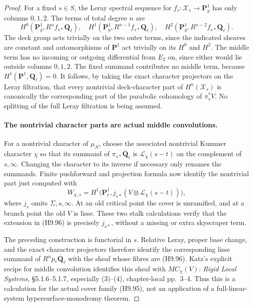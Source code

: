 \begin{proof}
For a fixed $s\in S$, the Leray spectral sequence for
$f_s:\mathcal X_s\to\mathbf P^1_y$ has only columns $0,1,2$.
The terms of total degree $n$ are
\[
 H^0(\mathbf P^1_y,R^n f_{s*}\mathbf Q_\ell),\quad
 H^1(\mathbf P^1_y,R^{n-1}f_{s*}\mathbf Q_\ell),\quad
 H^2(\mathbf P^1_y,R^{n-2}f_{s*}\mathbf Q_\ell).
\]
The deck group acts trivially on the two outer terms, since
the indicated sheaves are constant and automorphisms of
$\mathbf P^1$ act trivially on its $H^0$ and $H^2$.
The middle term has no incoming or outgoing differential from
$E_2$ on, since either would lie outside columns $0,1,2$.
The fixed summand contributes no middle term, because
$H^1(\mathbf P^1,\mathbf Q_\ell)=0$. It follows, by taking the
exact character projectors on the Leray filtration, that every
nontrivial deck-character part of $H^n(\mathcal X_s)$ is
canonically the corresponding part of the parabolic cohomology
of $\pi_s^*V$. No splitting of the full Leray filtration is
being assumed.

\paragraph{The nontrivial character parts are actual middle convolutions.}
For a nontrivial character of $\mu_N$, choose the associated
nontrivial Kummer character $\chi$ so that its summand of
$\pi_{s*}\overline{\mathbf Q}_\ell$ is
$\mathcal L_\chi(s-t)$ on the complement of $s,\infty$.
Changing the character to its inverse if necessary only
renames the summands. Finite pushforward and projection formula
now identify the nontrivial part just computed with
\[
 W_{\chi,s}
  =H^1\bigl(\mathbf P^1_t,
        j_{s*}(V\otimes\mathcal L_\chi(s-t))\bigr),
                                                               \tag{H9.96}
\]
where $j_s$ omits $\Sigma,s,\infty$. At an old critical point
the cover is unramified, and at a branch point the old $V$ is
lisse. These two stalk calculations verify that the extension
in (H9.96) is precisely $j_{s*}$, without a missing or extra
skyscraper term.

The preceding construction is functorial in $s$. Relative
Leray, proper base change, and the exact character projectors
therefore identify the corresponding lisse summand of
$R^n p_*\overline{\mathbf Q}_\ell$ with the sheaf whose fibres
are (H9.96). Katz's explicit recipe for middle convolution
identifies this sheaf with $MC_\chi(V)$: \emph{Rigid Local
Systems}, \S5.1.6--5.1.7, especially (3)--(4), chapter-local
pp.~3--4. Thus this is a calculation for the actual cover
family (H9.95), not an application of a full-linear-system
hypersurface-monodromy theorem.


\end{proof}
